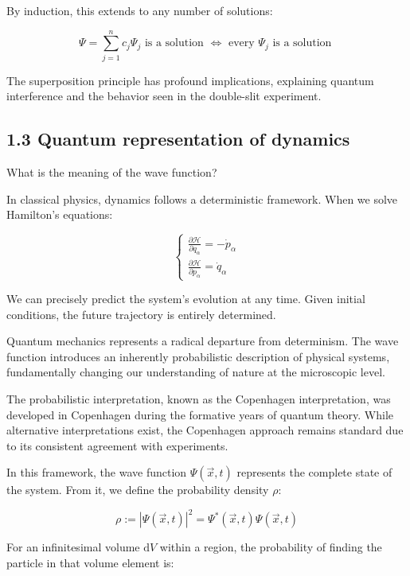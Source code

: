 \documentclass[10pt]{article}
\begin{document}
By induction, this extends to any number of solutions:

\begin{equation*}
\Psi=\sum_{j=1}^{n} c_{j} \Psi_{j} \text{ is a solution } \Longleftrightarrow \text{ every } \Psi_{j} \text{ is a solution } \tag{1.21}
\end{equation*}

The superposition principle has profound implications, explaining quantum interference and the behavior seen in the double-slit experiment.

\subsection*{1.3 Quantum representation of dynamics}
What is the meaning of the wave function?

In classical physics, dynamics follows a deterministic framework. When we solve Hamilton's equations:

\[
\left\{\begin{array}{l}
\frac{\partial \mathcal{H}}{\partial q_{\alpha}}=-\dot{p}_{\alpha}  \tag{1.22}\\
\frac{\partial \mathcal{H}}{\partial p_{\alpha}}=\dot{q}_{\alpha}
\end{array}\right.
\]

We can precisely predict the system's evolution at any time. Given initial conditions, the future trajectory is entirely determined.

Quantum mechanics represents a radical departure from determinism. The wave function introduces an inherently probabilistic description of physical systems, fundamentally changing our understanding of nature at the microscopic level.

The probabilistic interpretation, known as the Copenhagen interpretation, was developed in Copenhagen during the formative years of quantum theory. While alternative interpretations exist, the Copenhagen approach remains standard due to its consistent agreement with experiments.

In this framework, the wave function $\Psi(\vec{x}, t)$ represents the complete state of the system. From it, we define the probability density $\rho$:

\begin{equation*}
\rho:=|\Psi(\vec{x}, t)|^{2} = \Psi^*(\vec{x}, t)\Psi(\vec{x}, t) \tag{1.23}
\end{equation*}

For an infinitesimal volume $\mathrm{d}V$ within a region, the probability of finding the particle in that volume element is:
\end{document}
